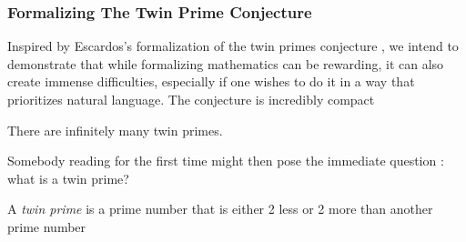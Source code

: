 \begin{code}[hide]
\AgdaSymbol{;}\AgdaSpace{}%
\AgdaSymbol{;}\AgdaSpace{}%
\AgdaSymbol{)}\<%
\\
%
\\[\AgdaEmptyExtraSkip]%
\>[0]\AgdaOperator{\AgdaFunction{\AgdaUnderscore{}-\AgdaUnderscore{}}}\AgdaSpace{}%
\AgdaSymbol{:}\AgdaSpace{}%
\AgdaSpace{}%
\AgdaSpace{}%
\AgdaSpace{}%
\AgdaSpace{}%
\<%
\\
\>[0]%
\>[6]\AgdaOperator{\AgdaFunction{-}}\AgdaSpace{}%
\AgdaSpace{}%
\AgdaSymbol{=}\AgdaSpace{}%
\<%
\\
\>[0]%
\>[6]\AgdaOperator{\AgdaFunction{-}}\AgdaSpace{}%
\AgdaSpace{}%
\AgdaSpace{}%
\AgdaSymbol{=}\AgdaSpace{}%
\<%
\\
\>[0]\AgdaSpace{}%
\AgdaSpace{}%
\AgdaOperator{\AgdaFunction{-}}\AgdaSpace{}%
\AgdaSpace{}%
\AgdaSpace{}%
\AgdaSymbol{=}\AgdaSpace{}%
\AgdaSpace{}%
\AgdaOperator{\AgdaFunction{-}}\AgdaSpace{}%
\<%
\end{code}
\subsubsection{Formalizing The Twin Prime Conjecture}

Inspired by Escardos's formalization of the twin primes conjecture \cite{escardó2020introduction}, we intend to
demonstrate that while formalizing mathematics can be rewarding, it can also
create immense difficulties, especially if one wishes to do it in a way that
prioritizes natural language. The conjecture is incredibly compact

\begin{lem}
There are infinitely many twin primes.
\end{lem}

Somebody reading for the first time might then pose the immediate question : what is a twin prime?

\begin{definition}\label{def:def1}
A \emph{twin prime} is a prime number that is either 2 less or 2 more than another prime number
\end{definition}

